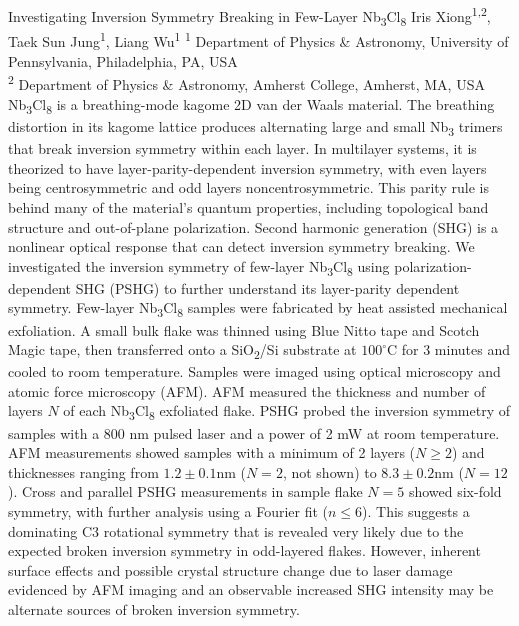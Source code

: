 \makeabstract
    {
    Investigating Inversion Symmetry Breaking in Few-Layer Nb\textsubscript{3}Cl\textsubscript{8}
    }
    {
    Iris Xiong\textsuperscript{1,2}, Taek Sun Jung\textsuperscript{1}, Liang Wu\textsuperscript{1}
    }
    {
    \textsuperscript{1} Department of Physics \& Astronomy, University of Pennsylvania, Philadelphia, PA, USA\\
    \textsuperscript{2} Department of Physics \& Astronomy, Amherst College, Amherst, MA, USA
    }
    {
    Nb\textsubscript{3}Cl\textsubscript{8} is a breathing-mode kagome 2D van der Waals material. The breathing distortion in its kagome lattice produces alternating large and small Nb\textsubscript{3} trimers that break inversion symmetry within each layer. In multilayer systems, it is theorized to have layer-parity-dependent inversion symmetry, with even layers being centrosymmetric and odd layers noncentrosymmetric. This parity rule is behind many of the material's quantum properties, including topological band structure and out-of-plane polarization. Second harmonic generation (SHG) is a nonlinear optical response that can detect inversion symmetry breaking. We investigated the inversion symmetry of few-layer Nb\textsubscript{3}Cl\textsubscript{8} using polarization-dependent SHG (PSHG) to further understand its layer-parity dependent symmetry.
    }
    {
    Few-layer Nb\textsubscript{3}Cl\textsubscript{8} samples were fabricated by heat assisted mechanical exfoliation. A small bulk flake was thinned using Blue Nitto tape and Scotch Magic tape, then transferred onto a SiO\textsubscript{2}/Si substrate at $100^\circ$C for 3 minutes and cooled to room temperature. Samples were imaged using optical microscopy and atomic force microscopy (AFM). AFM measured the thickness and number of layers $N$ of each Nb\textsubscript{3}Cl\textsubscript{8} exfoliated flake. PSHG probed the inversion symmetry of samples with a 800 nm pulsed laser and a power of 2 mW at room temperature.
    }
    {
    AFM measurements showed samples with a minimum of 2 layers ($N \geq 2$) and thicknesses ranging from $1.2 \pm 0.1$nm ($N = 2$, not shown) to $8.3 \pm 0.2$nm ($N = 12$). Cross and parallel PSHG measurements in sample flake $N = 5$ showed six-fold symmetry, with further analysis using a Fourier fit ($n \leq 6$). This suggests a dominating C3 rotational symmetry that is revealed very likely due to the expected broken inversion symmetry in odd-layered flakes. However, inherent surface effects and possible crystal structure change due to laser damage evidenced by AFM imaging and an observable increased SHG intensity may be alternate sources of broken inversion symmetry.
    }
